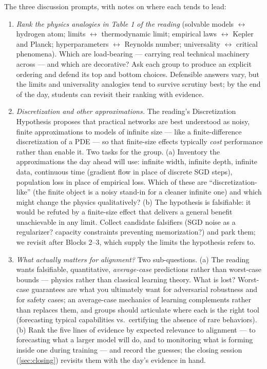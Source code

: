 \documentclass[11pt]{article}
\begin{document}
The three discussion prompts, with notes on where each tends to lead:

\begin{enumerate}
  \item \emph{Rank the physics analogies in Table 1 of the reading}
  (solvable models $\leftrightarrow$ hydrogen atom; limits
  $\leftrightarrow$ thermodynamic limit; empirical laws $\leftrightarrow$
  Kepler and Planck; hyperparameters $\leftrightarrow$ Reynolds number;
  universality $\leftrightarrow$ critical phenomena). Which are
  load-bearing --- carrying real technical machinery across --- and which
  are decorative? Ask each group to produce an explicit ordering and defend
  its top and bottom choices. Defensible answers vary, but the limits and
  universality analogies tend to survive scrutiny best; by the end of the
  day, students can revisit their ranking with evidence.
  \item \emph{Discretization and other approximations.} The reading's
  Discretization Hypothesis proposes that practical networks are best
  understood as noisy, finite approximations to models of infinite size ---
  like a finite-difference discretization of a PDE --- so that finite-size
  effects typically \emph{cost} performance rather than enable it. Two
  tasks for the group. (a) Inventory the approximations the day ahead will
  use: infinite width, infinite depth, infinite data, continuous time
  (gradient flow in place of discrete SGD steps), population loss in place
  of empirical loss. Which of these are ``discretization-like'' (the finite
  object is a noisy stand-in for a cleaner infinite one) and which might
  change the physics qualitatively? (b) The hypothesis is falsifiable: it
  would be refuted by a finite-size effect that delivers a general benefit
  unachievable in any limit. Collect candidate falsifiers (SGD noise as a
  regularizer? capacity constraints preventing memorization?) and park
  them; we revisit after Blocks 2--3, which supply the limits the
  hypothesis refers to.
  \item \emph{What actually matters for alignment?} Two sub-questions.
  (a) The reading wants falsifiable, quantitative, \emph{average-case}
  predictions rather than worst-case bounds --- physics rather than
  classical learning theory. What is lost? Worst-case guarantees are what
  you ultimately want for adversarial robustness and for safety cases; an
  average-case mechanics of learning complements rather than replaces
  them, and groups should articulate where each is the right tool
  (forecasting typical capabilities vs.\ certifying the absence of rare
  behaviors). (b) Rank the five lines of evidence by expected relevance to
  alignment --- to forecasting what a larger model will do, and to
  monitoring what is forming inside one during training --- and record the
  guesses; the closing session (\cref{sec:closing}) revisits them with the
  day's evidence in hand.
\end{enumerate}
\end{document}
